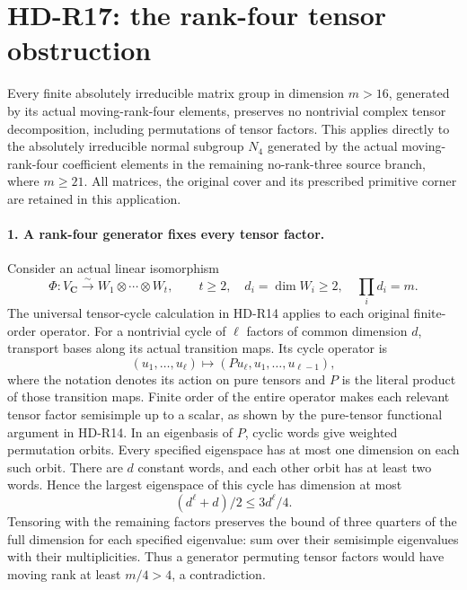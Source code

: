 \section{HD-R17: the rank-four tensor obstruction}
\label{sec:rank-four-tensor-obstruction}

Every finite absolutely irreducible matrix group in dimension
\(m>16\), generated by its actual moving-rank-four elements,
preserves no nontrivial complex tensor decomposition, including
permutations of tensor factors. This applies directly to the
absolutely irreducible normal subgroup \(N_4\) generated by
the actual moving-rank-four coefficient elements in the
remaining no-rank-three source branch, where \(m\ge21\).
All matrices, the original cover and its prescribed primitive
corner are retained in this application.

\paragraph{1. A rank-four generator fixes every tensor factor.}
Consider an actual linear isomorphism
\[
 \Phi:V_{\mathbf C}\xrightarrow{\sim}
            W_1\otimes\cdots\otimes W_t,
 \qquad t\ge2,\quad d_i=\dim W_i\ge2,
 \quad\prod_i d_i=m.                                    \tag{R17.1}
\]
The universal tensor-cycle calculation in HD-R14 applies to
each original finite-order operator. For a nontrivial cycle
of \(\ell\) factors of common dimension \(d\), transport
bases along its actual transition maps. Its cycle operator is
\[
 (u_1,\ldots,u_\ell)\longmapsto
               (P u_\ell,u_1,\ldots,u_{\ell-1}),         \tag{R17.2}
\]
where the notation denotes its action on pure tensors and
\(P\) is the literal product of those transition maps.
Finite order of the entire operator makes each relevant
tensor factor semisimple up to a scalar, as shown by the
pure-tensor functional argument in HD-R14. In an eigenbasis
of \(P\), cyclic words give weighted permutation orbits.
Every specified eigenspace has at most one dimension on
each such orbit. There are \(d\) constant words, and
each other orbit has at least two words. Hence the largest
eigenspace of this cycle has dimension at most
\[
       (d^\ell+d)/2\le3d^\ell/4.                        \tag{R17.3}
\]
Tensoring with the remaining factors preserves the bound
of three quarters of the full dimension for each specified
eigenvalue: sum over their semisimple eigenvalues with their
multiplicities. Thus a generator permuting tensor factors
would have moving rank at least \(m/4>4\), a contradiction.

